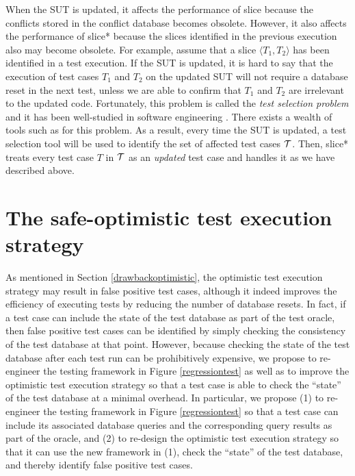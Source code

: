 \documentclass[authoryear,preprint,12pt]{elsarticle}
\begin{document}
When the SUT is updated, it affects the performance of {\sc slice} because the conflicts stored in the conflict database becomes obsolete.
However, it also affects the performance of {\sc slice*} because the slices identified in the previous execution also may become obsolete.
For example, assume that a slice $\langle T_1, T_2 \rangle$ has been identified in a test execution.
If the SUT is updated, 
it is hard to say that the execution of test cases $T_1$ and $T_2$ on the updated SUT will not require a database reset in the next test,
unless we are able to confirm that $T_1$ and $T_2$ are irrelevant to the updated code.
Fortunately, this problem is called the \emph{test selection problem} and it has been well-studied in software engineering \cite{tse96rothermel, tse97rothermel}.
There exists a wealth of tools such as \cite{tse01rothermel, icsm05willlmor} for this problem.
As a result, every time the SUT is updated, 
a test selection tool will be used to identify the set of affected test cases $\cal{T}$.
Then, {\sc slice*} treats every test case $T$ in $\cal{T}$ as an \emph{updated} test case and handles it as we have described above.

\section{The {\sc safe-optimistic} test execution strategy}
   \label{safe-optimistic}
As mentioned in Section \ref{drawbackoptimistic}, the {\sc optimistic} test execution strategy may result in false positive test cases,
although it indeed improves the efficiency of executing tests by reducing the number of database resets.
In fact, if a test case can include the state of the test database as part of the test oracle, 
then false positive test cases can be identified by simply checking the consistency of the test database at that point.
However, because checking the state of the test database after each test run can be prohibitively expensive,
we propose to re-engineer the testing framework in Figure \ref{regressiontest}
as well as to improve the {\sc optimistic} test execution strategy so that 
a test case is able to check the ``state'' of the test database at a minimal overhead.
In particular, we propose (1) to re-engineer the testing framework in Figure \ref{regressiontest}
so that a test case can include its associated database queries and the corresponding query results as part of the oracle, and
(2) to re-design the {\sc optimistic} test execution strategy so that it can 
use the new framework in (1), check the ``state'' of the test database, and thereby identify false positive test cases.
\end{document}
